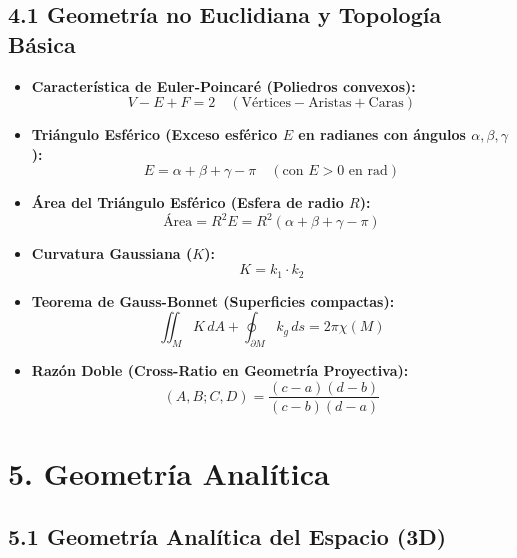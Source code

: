 \documentclass[11pt,a4paper]{article}
\begin{document}
\subsection*{4.1 Geometría no Euclidiana y Topología Básica}

\begin{itemize}
  \item \textbf{Característica de Euler-Poincaré (Poliedros convexos):}
  \[
    V - E + F = 2 \quad (\text{Vértices} - \text{Aristas} + \text{Caras})
  \]
  \item \textbf{Triángulo Esférico (Exceso esférico $E$ en radianes con ángulos $\alpha, \beta, \gamma$):}
  \[
    E = \alpha + \beta + \gamma - \pi \quad (\text{con } E > 0 \text{ en rad})
  \]
  \item \textbf{Área del Triángulo Esférico (Esfera de radio $R$):}
  \[
    \text{Área} = R^2 E = R^2 (\alpha + \beta + \gamma - \pi)
  \]
  \item \textbf{Curvatura Gaussiana ($K$):}
  \[
    K = k_1 \cdot k_2
  \]
  \item \textbf{Teorema de Gauss-Bonnet (Superficies compactas):}
  \[
    \iint_M K \, dA + \oint_{\partial M} k_g \, ds = 2\pi \chi(M)
  \]
  \item \textbf{Razón Doble (Cross-Ratio en Geometría Proyectiva):}
  \[
    (A, B; C, D) = \frac{(c - a)(d - b)}{(c - b)(d - a)}
  \]
\end{itemize}

\section*{5. Geometría Analítica}

\subsection*{5.1 Geometría Analítica del Espacio (3D)}
\end{document}

